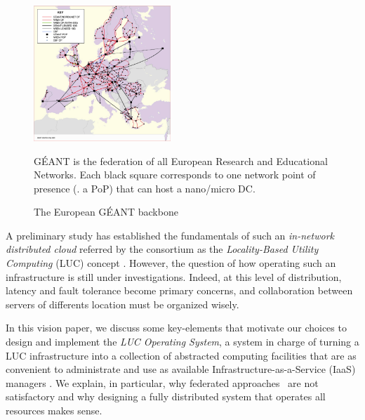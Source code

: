\begin{figure}
\centering
\includegraphics[width=0.46\textwidth]{./figures/geant.png}
\label{fig:geant}
\vspace*{-.35cm}
\caption{The European G\'EANT backbone}
{\small
 G\'EANT is the federation of all European Research and Educational
 Networks.
Each black square corresponds to one network point of presence (\aka.
a PoP) that can host a nano/micro DC.}
\vspace*{-.5cm}
\end{figure}

A preliminary study has established the fundamentals of such an
\emph{in-network distributed cloud} referred by the consortium  as the
\emph{Locality-Based Utility Computing} (LUC) concept
\cite{lebre:beyond2013}. However, the question of how operating such
an infrastructure is still under investigations. Indeed, at this level of
distribution, latency and fault tolerance become primary concerns, and
collaboration between servers of differents location must be organized
wisely.

In this vision paper, we discuss some key-elements that
motivate our choices to design and implement the
\emph{LUC Operating System}, a system in charge of turning
a LUC infrastructure into a collection of abstracted computing
facilities that are as convenient to administrate and use as available
Infrastructure-as-a-Service (IaaS) managers
\cite{cloudstack,opennebula,openstack}.
We explain, in particular, why federated approaches~\cite{buyya:intercloud} are not satisfactory  and
why designing a fully distributed system that operates all resources makes
sense.


%
%
%




